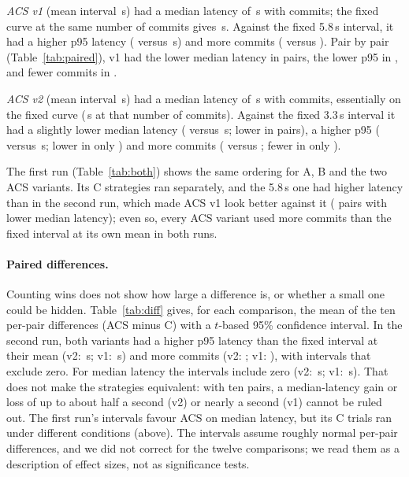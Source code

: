 \documentclass[10pt,twocolumn]{article}
\begin{document}
\emph{ACS v1} (mean interval \IntervalAcsOneTwo\,s) had a median latency of
\PfiftyAcsOneTwo\,s with \CommitsAcsOneTwo{} commits; the fixed curve at the
same number of commits gives \CurveAcsOneTwo\,s. Against the fixed 5.8\,s
interval, it had a higher p95 latency (\PninetyfiveAcsOneTwo{} versus
\PninetyfiveCfiveTwo\,s) and more commits (\CommitsAcsOneTwo{} versus
\CommitsCfiveTwo). Pair by pair (Table~\ref{tab:paired}), v1 had the lower
median latency in \PairPfiftyAcsOneTwo{} pairs, the lower p95 in
\PairPninetyfiveAcsOneTwo, and fewer commits in \PairCommitsAcsOneTwo.

\emph{ACS v2} (mean interval \IntervalAcsTwoTwo\,s) had a median latency of
\PfiftyAcsTwoTwo\,s with \CommitsAcsTwoTwo{} commits, essentially on the fixed
curve (\CurveAcsTwoTwo\,s at that number of commits). Against the fixed 3.3\,s
interval it had a slightly lower median latency (\PfiftyAcsTwoTwo{} versus
\PfiftyCthreeTwo\,s; lower in \PairPfiftyAcsTwoTwo{} pairs), a higher p95
(\PninetyfiveAcsTwoTwo{} versus \PninetyfiveCthreeTwo\,s; lower in only
\PairPninetyfiveAcsTwoTwo) and more commits (\CommitsAcsTwoTwo{} versus
\CommitsCthreeTwo; fewer in only \PairCommitsAcsTwoTwo).

The first run (Table~\ref{tab:both}) shows the same ordering for A, B and the
two ACS variants. Its C strategies ran separately, and the 5.8\,s one had
higher latency than in the second run, which made ACS v1 look better against it
(\PairPfiftyAcsOneOne{} pairs with lower median latency); even so, every ACS
variant used more commits than the fixed interval at its own mean in both runs.

\paragraph{Paired differences.}
Counting wins does not show how large a difference is, or whether a small one
could be hidden. Table~\ref{tab:diff} gives, for each comparison, the mean of
the ten per-pair differences (ACS minus C) with a $t$-based 95\% confidence
interval. In the second run, both variants had a higher p95 latency than the
fixed interval at their mean (v2: \DiffPninetyfiveAcsTwoTwo\,s; v1:
\DiffPninetyfiveAcsOneTwo\,s) and more commits (v2: \DiffCommitsAcsTwoTwo;
v1: \DiffCommitsAcsOneTwo), with intervals that exclude zero. For median
latency the intervals include zero (v2: \DiffPfiftyAcsTwoTwo\,s; v1:
\DiffPfiftyAcsOneTwo\,s). That does not make the strategies equivalent: with
ten pairs, a median-latency gain or loss of up to about half a second (v2) or
nearly a second (v1) cannot be ruled out. The first run's intervals favour ACS
on median latency, but its C trials ran under different conditions (above).
The intervals assume roughly normal per-pair differences, and we did not
correct for the twelve comparisons; we read them as a description of effect
sizes, not as significance tests.
\end{document}
